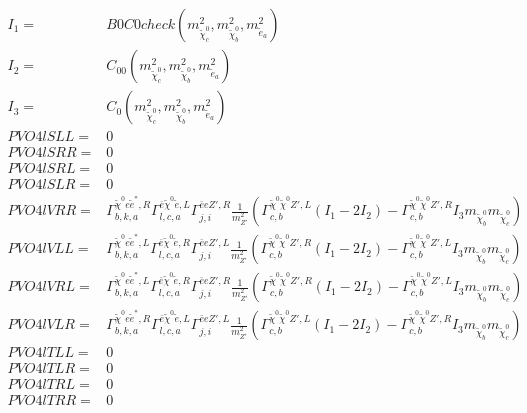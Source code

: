 \documentclass[A4,landscape]{article}
\begin{document}
\begin{align} 
I_1= & B0C0check(m^2_{\tilde{\chi}^0_{{c}}}, m^2_{\tilde{\chi}^0_{{b}}}, m^2_{\tilde{e}_{{a}}}) \\ 
I_2= & C_{00}(m^2_{\tilde{\chi}^0_{{c}}}, m^2_{\tilde{\chi}^0_{{b}}}, m^2_{\tilde{e}_{{a}}}) \\ 
I_3= & C_0(m^2_{\tilde{\chi}^0_{{c}}}, m^2_{\tilde{\chi}^0_{{b}}}, m^2_{\tilde{e}_{{a}}}) \\ 
  PVO4lSLL= & 0 \\ 
  PVO4lSRR= & 0 \\ 
  PVO4lSRL= & 0 \\ 
  PVO4lSLR= & 0 \\ 
  PVO4lVRR= &  \Gamma^{\tilde{\chi}^0 e \tilde{e}^*,R}_{b, k, a} \Gamma^{\bar{e}\tilde{\chi}^0 \tilde{e} ,L}_{l, c, a} \Gamma^{\bar{e}e {Z'} ,R}_{j, i} \frac{1}{m^2_{{Z'}}} (\Gamma^{\tilde{\chi}^0 \tilde{\chi}^0 {Z'} ,L}_{c, b} (I_1 - 2 I_2) - \Gamma^{\tilde{\chi}^0 \tilde{\chi}^0 {Z'} ,R}_{c, b} I_3 m_{\tilde{\chi}^0_{{b}}} m_{\tilde{\chi}^0_{{c}}}) \\ 
  PVO4lVLL= &  \Gamma^{\tilde{\chi}^0 e \tilde{e}^*,L}_{b, k, a} \Gamma^{\bar{e}\tilde{\chi}^0 \tilde{e} ,R}_{l, c, a} \Gamma^{\bar{e}e {Z'} ,L}_{j, i} \frac{1}{m^2_{{Z'}}} (\Gamma^{\tilde{\chi}^0 \tilde{\chi}^0 {Z'} ,R}_{c, b} (I_1 - 2 I_2) - \Gamma^{\tilde{\chi}^0 \tilde{\chi}^0 {Z'} ,L}_{c, b} I_3 m_{\tilde{\chi}^0_{{b}}} m_{\tilde{\chi}^0_{{c}}}) \\ 
  PVO4lVRL= &  \Gamma^{\tilde{\chi}^0 e \tilde{e}^*,L}_{b, k, a} \Gamma^{\bar{e}\tilde{\chi}^0 \tilde{e} ,R}_{l, c, a} \Gamma^{\bar{e}e {Z'} ,R}_{j, i} \frac{1}{m^2_{{Z'}}} (\Gamma^{\tilde{\chi}^0 \tilde{\chi}^0 {Z'} ,R}_{c, b} (I_1 - 2 I_2) - \Gamma^{\tilde{\chi}^0 \tilde{\chi}^0 {Z'} ,L}_{c, b} I_3 m_{\tilde{\chi}^0_{{b}}} m_{\tilde{\chi}^0_{{c}}}) \\ 
  PVO4lVLR= &  \Gamma^{\tilde{\chi}^0 e \tilde{e}^*,R}_{b, k, a} \Gamma^{\bar{e}\tilde{\chi}^0 \tilde{e} ,L}_{l, c, a} \Gamma^{\bar{e}e {Z'} ,L}_{j, i} \frac{1}{m^2_{{Z'}}} (\Gamma^{\tilde{\chi}^0 \tilde{\chi}^0 {Z'} ,L}_{c, b} (I_1 - 2 I_2) - \Gamma^{\tilde{\chi}^0 \tilde{\chi}^0 {Z'} ,R}_{c, b} I_3 m_{\tilde{\chi}^0_{{b}}} m_{\tilde{\chi}^0_{{c}}}) \\ 
  PVO4lTLL= & 0 \\ 
  PVO4lTLR= & 0 \\ 
  PVO4lTRL= & 0 \\ 
  PVO4lTRR= & 0 \\ 
\end{align} 
\end{document}

